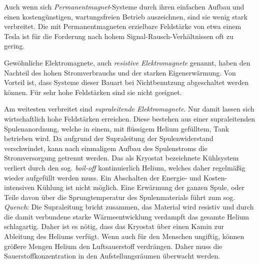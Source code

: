 Auch wenn sich \textit{Permanentmagnet}-Systeme durch ihren einfachen Aufbau und einen kostengünstigen, wartungsfreien Betrieb auszeichnen, sind sie wenig stark verbreitet. Die mit Permanentmagneten erzielbare Feldstärke von etwa einem Tesla ist für die Forderung nach hohem Signal-Rausch-Verhältnissen oft zu gering.

Gewöhnliche Elektromagnete, auch \textit{resistive Elektromagnete} genannt, haben den Nachteil des hohen Stromverbrauchs und der starken Eigenerwärmung. Von Vorteil ist, dass Systeme dieser Bauart bei Nichtbenutzung abgeschaltet werden können. Für sehr hohe Feldstärken sind sie nicht geeignet.

Am weitesten verbreitet sind \textit{supraleitende Elektromagnete}. Nur damit lassen sich wirtschaftlich hohe Feldstärken erreichen. Diese bestehen aus einer supraleitenden Spulenanordnung, welche in einem, mit flüssigem Helium gefülltem, Tank betrieben wird. Da aufgrund der Supraleitung der Spulenwiderstand verschwindet, kann nach einmaligem Aufbau des Spulenstroms die Stromversorgung getrennt werden. Das als Kryostat bezeichnete Kühlsystem verliert durch den sog. \textit{boil-off} kontinuierlich Helium, welches daher regelmäßig wieder aufgefüllt werden muss. Ein Abschalten der Energie- und Kosten-intensiven Kühlung ist nicht möglich. Eine Erwärmung der ganzen Spule, oder Teile davon über die Sprungtemperatur des Spulenmaterials führt zum sog. \textit{Quench}: Die Supraleitung bricht zusammen, das Material wird resistiv und durch die damit verbundene starke Wärmeentwicklung verdampft das gesamte Helium schlagartig. Daher ist es nötig, dass das Kryostat über einen Kamin zur Ableitung des Heliums verfügt. Wenn auch für den Menschen ungiftig, können größere Mengen Helium den Luftsauerstoff verdrängen. Daher muss die Sauerstoffkonzentration in den Aufstellungsräumen überwacht werden.

